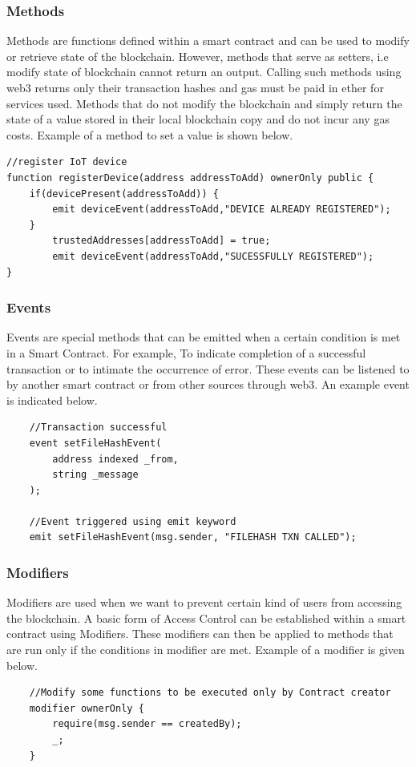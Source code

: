 \documentclass[11pt,openright]{report}
\begin{document}
\subsubsection{Methods}
Methods are functions defined within a smart contract and can be used to modify or retrieve state of the blockchain. However, methods that serve as setters, i.e modify state of blockchain cannot return an output. Calling such methods using web3 returns only their transaction hashes and gas must be paid in ether for services used. Methods that do not modify the blockchain and simply return the state of a value stored in their local blockchain copy and do not incur any gas costs. Example of a method to set a value is shown below.
\begin{lstlisting}
//register IoT device
function registerDevice(address addressToAdd) ownerOnly public {
    if(devicePresent(addressToAdd)) {
        emit deviceEvent(addressToAdd,"DEVICE ALREADY REGISTERED");
    }
        trustedAddresses[addressToAdd] = true;
        emit deviceEvent(addressToAdd,"SUCESSFULLY REGISTERED");
}
\end{lstlisting}


\subsubsection{Events}
Events are special methods that can be emitted when a certain condition is met in a Smart Contract. For example, To indicate completion of a successful transaction or to intimate the occurrence of error. These events can be listened to by another smart contract or from other sources through web3. An example event is indicated below.
\begin{lstlisting}
    //Transaction successful
    event setFileHashEvent(
        address indexed _from,
        string _message
    );
    
    //Event triggered using emit keyword
    emit setFileHashEvent(msg.sender, "FILEHASH TXN CALLED");
\end{lstlisting}


\subsubsection{Modifiers}
Modifiers are used when we want to prevent certain kind of users from accessing the blockchain. A basic form of Access Control can be established within a smart contract using Modifiers. These modifiers can then be applied to methods that are run only if the conditions in modifier are met. Example of a modifier is given below.
\begin{lstlisting}
    //Modify some functions to be executed only by Contract creator
    modifier ownerOnly {
        require(msg.sender == createdBy);
        _;
    }
\end{lstlisting}
\end{document}
